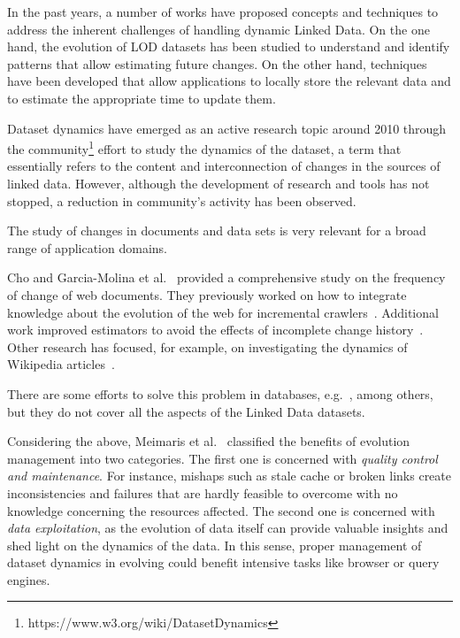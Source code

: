 \documentclass[sw]{iosart2x}
\begin{document}
In the past years, a number of works have proposed concepts and techniques to address the inherent challenges of handling dynamic Linked Data. On the one hand, the evolution of LOD datasets has been studied to understand and identify patterns that allow estimating future changes. On the other hand, techniques have been developed that allow applications to locally store the relevant data and to estimate the appropriate time to update them.



Dataset dynamics have emerged as an active research topic around 2010 through the community\footnote{https://www.w3.org/wiki/DatasetDynamics} effort to study the dynamics of the dataset, a term that essentially refers to the content and interconnection of changes in the sources of linked data.  However, although the development of research and tools has not stopped, a reduction in community's activity has been observed.


The study of changes in documents and data sets is very relevant for a broad range of application domains. 

Cho and Garcia-Molina et al.~\cite{ChoG03} provided a comprehensive study on the frequency of change of web documents. They previously worked on how to integrate knowledge about the evolution of the web for incremental crawlers~\cite{ChoG00}. Additional work improved estimators to avoid the effects of incomplete change history~\cite{NeumaierU16}. Other research has focused, for example, on investigating the dynamics of Wikipedia articles~\cite{AlmeidaMC07}.

There are some efforts to solve this problem in databases, e.g.~\cite{LernerH90, BancilhonDK92, Roddick95}, among others, but they do not cover all the aspects of the Linked Data datasets.


Considering the above, Meimaris et al.~\cite{MeimarisPPGS14} classified the benefits of evolution management into two categories. The first one is concerned with \textit{quality control and maintenance}. For instance, mishaps such as stale cache or broken links create inconsistencies and failures that are hardly feasible to overcome with no knowledge concerning the resources affected. The second one is concerned with \textit{data exploitation}, as the evolution of data itself can provide valuable insights and shed light on the dynamics of the data. In this sense, proper management of dataset dynamics in evolving could benefit intensive tasks like browser or query engines.
\end{document}
